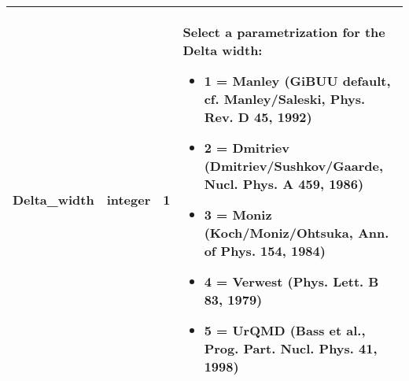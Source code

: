 \documentclass{article}
\begin{document}
\begin{longtable}{llll}
\midrule
Delta\_width & \begin{minipage}[t]{2cm}integer\end{minipage} & \begin{minipage}[t]{2cm}1\end{minipage} & \begin{minipage}[t]{12cm}Select a parametrization for the Delta width:\begin{itemize}\leftmargin0em\itemindent0pt\item 1 = Manley   (GiBUU default, cf. Manley/Saleski, Phys. Rev. D 45, 1992)\item 2 = Dmitriev (Dmitriev/Sushkov/Gaarde, Nucl. Phys. A 459, 1986)\item 3 = Moniz    (Koch/Moniz/Ohtsuka, Ann. of Phys. 154, 1984)\item 4 = Verwest  (Phys. Lett. B 83, 1979)\item 5 = UrQMD    (Bass et al., Prog. Part. Nucl. Phys. 41, 1998)\end{itemize}\end{minipage}\\*
\bottomrule
\end{longtable}
{ }



\end{document}
